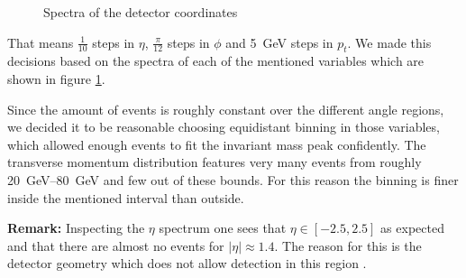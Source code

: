 \documentclass[11pt,a4paper,notitlepage]{scrartcl}
\begin{document}
\begin{figure}[t]
\begin{subfigure}{.49\linewidth}
		\subcaption{}
	\end{subfigure}
	\caption{Spectra of the detector coordinates}
	\label{fig:etaphip}
\end{figure}

That means $\frac{1}{10}$ steps in $\eta$, $\frac{\pi}{12}$ steps in $\phi$ and \SI{5}{\giga\eV} steps in $p_t$. We made this decisions based on the spectra of each of the mentioned variables which are shown in figure \ref{fig:etaphip}.

Since the amount of events is roughly constant over the different angle regions, we decided it to be reasonable choosing equidistant binning in those variables, which allowed enough events to fit the invariant mass peak confidently. The transverse momentum distribution features very many events from roughly \SIrange{20}{80}{\giga\eV} and few out of these bounds. For this reason the binning is finer inside the mentioned interval than outside.

\textbf{Remark:} Inspecting the $\eta$ spectrum one sees that $\eta\in[-2.5,2.5]$ as expected \cite{manual} and that there are almost no events for $|\eta|\approx 1.4$. The reason for this is the detector geometry which does not allow detection in this region \cite{Collaboration_2008}.
\end{document}
